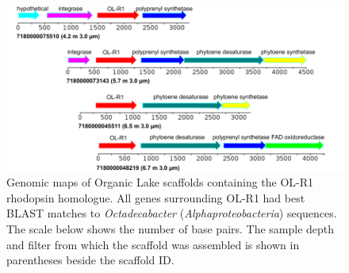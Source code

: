 \begin{figure}
\includegraphics[width=\textwidth]{orglake_figures/OLR1_scaffolds.pdf}
\caption[Maps of OL-R1 rhodopsin-containing scaffolds]{Genomic maps of Organic Lake scaffolds containing the OL-R1 rhodopsin homologue. All genes surrounding OL-R1 had best \ac{BLAST} matches to \emph{Octadecabacter} (\emph{Alphaproteobacteria}) sequences. The scale below shows the number of base pairs. The sample depth and filter from which the scaffold was assembled is shown in parentheses beside the scaffold ID.}
\label{fig:OLR1_scaffolds}

\end{figure}

